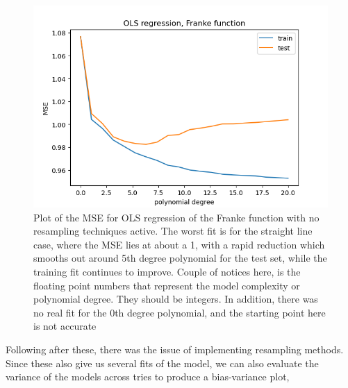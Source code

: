 \documentclass[12pt]{revtex4-2}
\begin{document}
\begin{figure}[hbtp]
\includegraphics[scale=0.7]{../plots/frankeOLSMSEsigma1maxdeg20.png}
\caption{Plot of the MSE for OLS regression of the Franke function with no resampling
	techniques active. The worst fit is for the straight line case, where the MSE lies
	at about a 1, with a rapid reduction which smooths out around 5th degree polynomial
	for the test set, while the training fit continues to improve. 
	Couple of notices here, is the floating point numbers that represent the model 
	complexity or polynomial degree. They should be integers. In addition, there was 
	no real fit for the 0th degree polynomial, and the starting point here is not 
	accurate}
\label{fig:MseNoResample}
\end{figure}

Following after these, there was the issue of implementing resampling methods. Since 
these also give us several fits of the model, we can also evaluate the variance of the
models across tries to produce a bias-variance plot,
\end{document}
